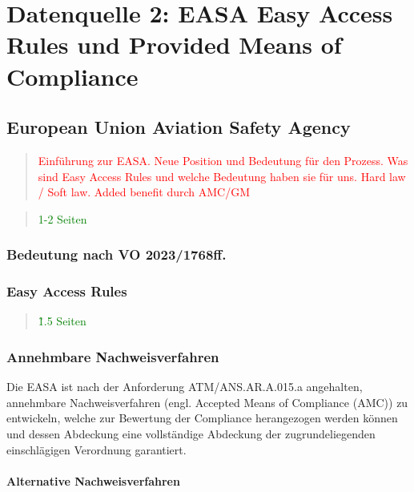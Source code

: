 \chapter{Datenquelle 2: EASA Easy Access Rules und Provided Means of Compliance}

    \section{European Union Aviation Safety Agency}

\begin{quote}
\textcolor{red}{Einführung zur EASA. Neue Position und Bedeutung für den Prozess. Was sind Easy Access Rules und welche Bedeutung haben sie für uns. Hard law / Soft law. Added benefit durch AMC/GM}
\end{quote}
\begin{quote}
\textcolor{green}{1-2 Seiten}
\end{quote}
        
        \subsection{Bedeutung nach VO 2023/1768ff.}
        
        \pagebreak
        \subsection{Easy Access Rules}

\begin{quote}
\textcolor{green}{\~1.5 Seiten}
\end{quote}

        \pagebreak
        \subsection{Annehmbare Nachweisverfahren}

        Die \ac{EASA} ist nach der Anforderung \textsf{ATM/ANS.AR.A.015.a} angehalten, annehmbare Nachweisverfahren (engl. Accepted Means of Compliance (AMC)) zu entwickeln, welche zur Bewertung der Compliance herangezogen werden können und dessen Abdeckung eine vollständige Abdeckung der zugrundeliegenden einschlägigen Verordnung garantiert. 
        \cite[Anh. II]{2017R0373}


    \subsubsection{Alternative Nachweisverfahren}
        
